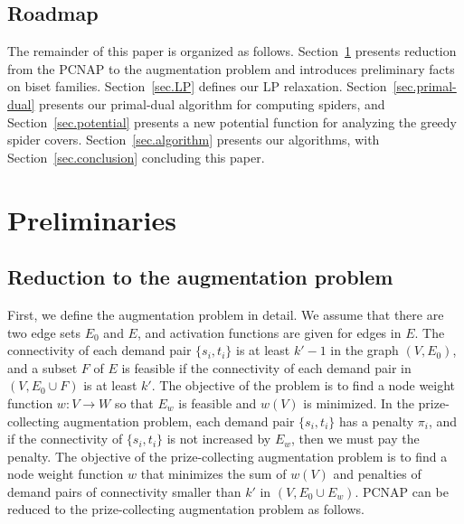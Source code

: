 \documentclass[11pt]{article}
\begin{document}
\subsection{Roadmap}
The remainder of this paper is organized as follows. 
Section~\ref{sec.preliminaries}
presents reduction from the PCNAP to the
augmentation problem
and introduces preliminary facts on biset families. 
Section~\ref{sec.LP}
defines our LP relaxation.
Section~\ref{sec.primal-dual} presents our primal-dual algorithm for
computing spiders, and Section~\ref{sec.potential}
presents a new potential function for analyzing the greedy spider covers.
Section~\ref{sec.algorithm} presents our algorithms, with
Section~\ref{sec.conclusion}
concluding this paper.

\section{Preliminaries}\label{sec.preliminaries}

\subsection{Reduction to the augmentation problem}\label{sec.augmentation}
First, we define the augmentation problem in detail.
We assume that there are two edge sets $E_0$ and $E$, and
activation functions are given for edges in $E$.
The connectivity of each 
demand pair $\{s_i,t_i\}$ is at least $k'-1$
in the graph $(V,E_0)$, 
and a subset $F$ of $E$ is feasible if
the connectivity of each demand pair in
$(V,E_0 \cup F)$ is at least $k'$.
The objective of the problem is to find a node weight function $w\colon V
\rightarrow W$ so that $E_w$ is feasible and
$w(V)$ is minimized.
In the prize-collecting augmentation problem, each demand pair
$\{s_i,t_i\}$
has a penalty $\pi_i$, and if the connectivity of $\{s_i,t_i\}$ is not
increased by $E_w$, then we
must pay the penalty. The objective of the prize-collecting
augmentation problem is to find a node weight function $w$ that
minimizes the sum of $w(V)$ and penalties of demand pairs of
connectivity smaller than $k'$ in $(V,E_0 \cup E_w)$.
PCNAP can be reduced to the
prize-collecting augmentation problem as follows.
\end{document}
